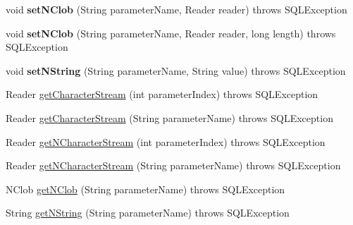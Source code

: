 \begin{DoxyCompactItemize}
void {\bfseries set\+N\+Clob} (String parameter\+Name, Reader reader)  throws S\+Q\+L\+Exception 
\item 
\mbox{\label{classcom_1_1mysql_1_1jdbc_1_1jdbc2_1_1optional_1_1_j_d_b_c4_callable_statement_wrapper_ac5edd90f62726b92aad9392698c4c780}} 
void {\bfseries set\+N\+Clob} (String parameter\+Name, Reader reader, long length)  throws S\+Q\+L\+Exception 
\item 
\mbox{\label{classcom_1_1mysql_1_1jdbc_1_1jdbc2_1_1optional_1_1_j_d_b_c4_callable_statement_wrapper_aa213459155621e3eb219ec62f38f47c9}} 
void {\bfseries set\+N\+String} (String parameter\+Name, String value)  throws S\+Q\+L\+Exception 
\item 
Reader \mbox{\hyperlink{classcom_1_1mysql_1_1jdbc_1_1jdbc2_1_1optional_1_1_j_d_b_c4_callable_statement_wrapper_acc541ce5d96383fa0a8ccaf950781f7d}{get\+Character\+Stream}} (int parameter\+Index)  throws S\+Q\+L\+Exception 
\item 
Reader \mbox{\hyperlink{classcom_1_1mysql_1_1jdbc_1_1jdbc2_1_1optional_1_1_j_d_b_c4_callable_statement_wrapper_a4f047ded7ebee06a6e26bd232d7894ff}{get\+Character\+Stream}} (String parameter\+Name)  throws S\+Q\+L\+Exception 
\item 
Reader \mbox{\hyperlink{classcom_1_1mysql_1_1jdbc_1_1jdbc2_1_1optional_1_1_j_d_b_c4_callable_statement_wrapper_a400ca8203416035c4d8a36f18c706524}{get\+N\+Character\+Stream}} (int parameter\+Index)  throws S\+Q\+L\+Exception 
\item 
Reader \mbox{\hyperlink{classcom_1_1mysql_1_1jdbc_1_1jdbc2_1_1optional_1_1_j_d_b_c4_callable_statement_wrapper_a4f4d3936b576ea61fb2ce59090b17f1c}{get\+N\+Character\+Stream}} (String parameter\+Name)  throws S\+Q\+L\+Exception 
\item 
N\+Clob \mbox{\hyperlink{classcom_1_1mysql_1_1jdbc_1_1jdbc2_1_1optional_1_1_j_d_b_c4_callable_statement_wrapper_a8313a0510ef3632b67ff4a07a600d699}{get\+N\+Clob}} (String parameter\+Name)  throws S\+Q\+L\+Exception 
\item 
String \mbox{\hyperlink{classcom_1_1mysql_1_1jdbc_1_1jdbc2_1_1optional_1_1_j_d_b_c4_callable_statement_wrapper_af7f9326a771826d643ee7b21b1d7771f}{get\+N\+String}} (String parameter\+Name)  throws S\+Q\+L\+Exception 
\item 

\end{DoxyCompactItemize}
